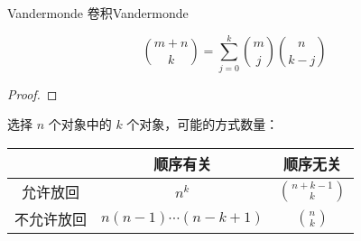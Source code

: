\begin{theorem}{Vandermonde 卷积}{Vandermonde}
    
    $$
    \binom{m + n}{k} = \sum_{j = 0}^{k} \binom{m}{j} \binom{n}{k - j}
    $$
    
\end{theorem}

\begin{proof}
    
\end{proof}

选择 \( n \) 个对象中的 \( k \) 个对象，可能的方式数量：

\begin{center}

\begin{tabular}{|c|c|c|}
\hline
& 顺序有关 & 顺序无关 \\
\hline
允许放回 & \( n^k \) & \( \displaystyle \binom{n+k-1}{k} \) \\
\hline
不允许放回 & \( n(n-1) \cdots (n-k+1) \) & \( \displaystyle \binom{n}{k} \) \\
\hline
\end{tabular}

\end{center}
